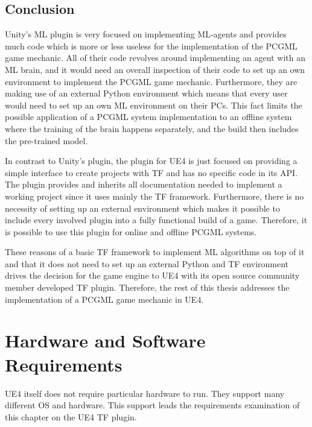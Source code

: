 \documentclass[MGS,Master,english]{twbook}%
\begin{document}
\subsection{Conclusion}
Unity’s ML plugin is very focused on implementing ML-agents and provides much code which is more or less useless for the implementation of the PCGML game mechanic. All of their code revolves around implementing an agent with an ML brain, and it would need an overall inspection of their code to set up an own environment to implement the PCGML game mechanic. Furthermore, they are making use of an external Python environment which means that every user would need to set up an own ML environment on their PCs. This fact limits the possible application of a PCGML system implementation to an offline system where the training of the brain happens separately, and the build then includes the pre-trained model.

In contrast to Unity’s plugin, the plugin for UE4 is just focused on providing a simple interface to create projects with \ac{TF} and has no specific code in its API. The plugin provides and inherits all documentation needed to implement a working project since it uses mainly the \ac{TF} framework. Furthermore, there is no necessity of setting up an external environment which makes it possible to include every involved plugin into a fully functional build of a game. Therefore, it is possible to use this plugin for online and offline PCGML systems.

These reasons of a basic \ac{TF} framework to implement ML algorithms on top of it and that it does not need to set up an external Python and \ac{TF} environment drives the decision for the game engine to UE4 with its open source community member developed \ac{TF} plugin. Therefore, the rest of this thesis addresses the implementation of a PCGML game mechanic in UE4.

\section{Hardware and Software Requirements}
UE4 itself does not require particular hardware to run. They support many different OS and hardware. This support leads the requirements examination of this chapter on the UE4 \ac{TF} plugin.
\end{document}
